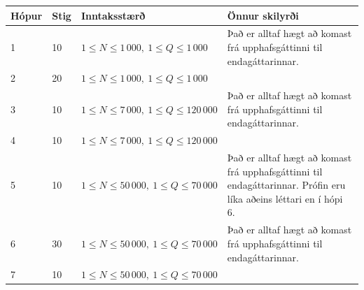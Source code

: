 \begin{tabular}{|l|l|l|l|}
\hline
Hópur & Stig & Inntaksstærð & Önnur skilyrði\\ \hline
1     & 10         & $ 1 \le N \le 1\,000,\ 1 \le Q \le 1\,000$ & Það er alltaf hægt að komast frá upphafsgáttinni til endagáttarinnar.\\ \hline
2     & 20         & $ 1 \le N \le 1\,000,\ 1 \le Q \le 1\,000$ &  \\ \hline
3     & 10         & $ 1 \le N \le 7\,000,\ 1 \le Q \le 120\,000$ & Það er alltaf hægt að komast frá upphafsgáttinni til endagáttarinnar.\\ \hline
4     & 10         & $ 1 \le N \le 7\,000,\ 1 \le Q \le 120\,000$ &  \\ \hline
5     & 10         & $ 1 \le N \le 50\,000,\ 1 \le Q \le 70\,000$ & Það er alltaf hægt að komast frá upphafsgáttinni til endagáttarinnar. Prófin eru líka aðeins léttari en í hópi 6.\\ \hline
6     & 30         & $ 1 \le N \le 50\,000,\ 1 \le Q \le 70\,000$ & Það er alltaf hægt að komast frá upphafsgáttinni til endagáttarinnar. \\ \hline
7     & 10         & $ 1 \le N \le 50\,000,\ 1 \le Q \le 70\,000$ &  \\ \hline
\end{tabular}
